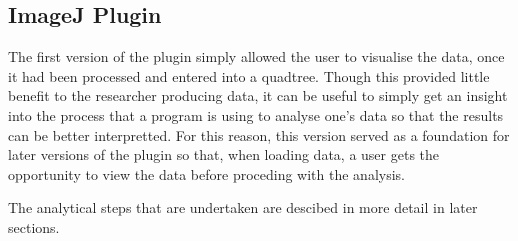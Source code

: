 
\subsection{ImageJ Plugin}
\label{sub:imagej_plugin}

The first version of the plugin simply allowed the user to visualise the data,
once it had been processed and entered into a quadtree. Though this provided
little benefit to the researcher producing data, it can be useful to simply get
an insight into the process that a program is using to analyse one's data so
that the results can be better interpretted. For this reason, this version
served as a foundation for later versions of the plugin so that, when loading
data, a user gets the opportunity to view the data before proceding with the
analysis.

The analytical steps that are undertaken are descibed in more detail in later
sections.
